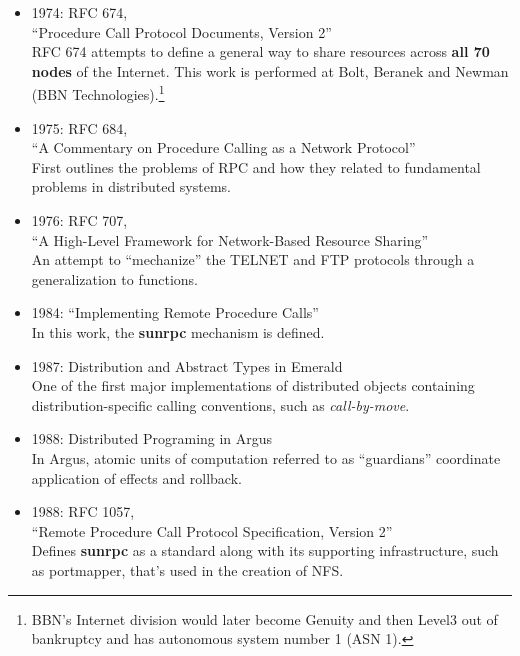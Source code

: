 \begin{itemize}

\item{1974:} RFC 674, \\ ``Procedure Call Protocol Documents, Version 2'' \\
	RFC 674 attempts to define a general way to share resources across \textbf{all 70 nodes} of the Internet.  This work is performed at Bolt, Beranek and Newman (BBN Technologies).\footnote{BBN's Internet division would later become Genuity and then Level3 out of bankruptcy and has autonomous system number 1 (ASN 1).}

\item{1975:} RFC 684, \\ ``A Commentary on Procedure Calling as a Network Protocol'' \\
	First outlines the problems of RPC and how they related to fundamental problems in distributed systems.

\item{1976:} RFC 707, \\ ``A High-Level Framework for Network-Based Resource Sharing'' \\
	An attempt to ``mechanize'' the TELNET and FTP protocols through a generalization to functions.

\item{1984:} ``Implementing Remote Procedure Calls''~\cite{birrell1984implementing} \\
	In this work, the \textbf{sunrpc} mechanism is defined.

\item{1987:} Distribution and Abstract Types in Emerald~\cite{1702134} \\
	One of the first major implementations of distributed objects containing distribution-specific calling conventions, such as \textit{call-by-move}.

\item{1988:} Distributed Programing in Argus~\cite{liskov1988distributed} \\
	In Argus, atomic units of computation referred to as ``guardians'' coordinate application of effects and rollback.

\item{1988:} RFC 1057, \\ ``Remote Procedure Call Protocol Specification, Version 2'' \\
	Defines \textbf{sunrpc} as a standard along with its supporting infrastructure, such as portmapper, that's used in the creation of NFS.


\end{itemize}

